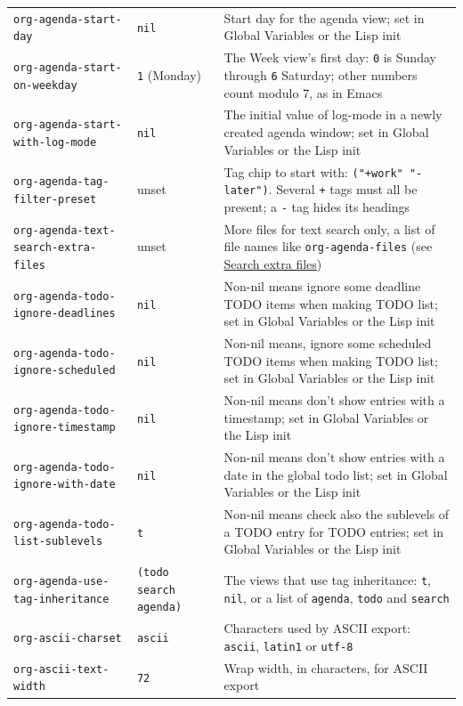 \documentclass[11pt]{article}
\begin{document}
\begin{center}
\begin{tabular}{lll}
\texttt{org-agenda-start-day} & \texttt{nil} & Start day for the agenda view; set in Global Variables or the Lisp init\\[0pt]
\texttt{org-agenda-start-on-weekday} & \texttt{1} (Monday) & The Week view's first day: \texttt{0} is Sunday through \texttt{6} Saturday; other numbers count modulo 7, as in Emacs\\[0pt]
\texttt{org-agenda-start-with-log-mode} & \texttt{nil} & The initial value of log-mode in a newly created agenda window; set in Global Variables or the Lisp init\\[0pt]
\texttt{org-agenda-tag-filter-preset} & unset & Tag chip to start with: \texttt{("+work" "-later")}. Several \texttt{+} tags must all be present; a \texttt{-} tag hides its headings\\[0pt]
\texttt{org-agenda-text-search-extra-files} & unset & More files for text search only, a list of file names like \texttt{org-agenda-files} (see \hyperref[sec:org67b7b15]{Search extra files})\\[0pt]
\texttt{org-agenda-todo-ignore-deadlines} & \texttt{nil} & Non-nil means ignore some deadline TODO items when making TODO list; set in Global Variables or the Lisp init\\[0pt]
\texttt{org-agenda-todo-ignore-scheduled} & \texttt{nil} & Non-nil means, ignore some scheduled TODO items when making TODO list; set in Global Variables or the Lisp init\\[0pt]
\texttt{org-agenda-todo-ignore-timestamp} & \texttt{nil} & Non-nil means don't show entries with a timestamp; set in Global Variables or the Lisp init\\[0pt]
\texttt{org-agenda-todo-ignore-with-date} & \texttt{nil} & Non-nil means don't show entries with a date in the global todo list; set in Global Variables or the Lisp init\\[0pt]
\texttt{org-agenda-todo-list-sublevels} & \texttt{t} & Non-nil means check also the sublevels of a TODO entry for TODO entries; set in Global Variables or the Lisp init\\[0pt]
\texttt{org-agenda-use-tag-inheritance} & \texttt{(todo search agenda)} & The views that use tag inheritance: \texttt{t}, \texttt{nil}, or a list of \texttt{agenda}, \texttt{todo} and \texttt{search}\\[0pt]
\texttt{org-ascii-charset} & \texttt{ascii} & Characters used by ASCII export: \texttt{ascii}, \texttt{latin1} or \texttt{utf-8}\\[0pt]
\texttt{org-ascii-text-width} & \texttt{72} & Wrap width, in characters, for ASCII export\\[0pt]

\end{tabular}
\end{center}
\end{document}
